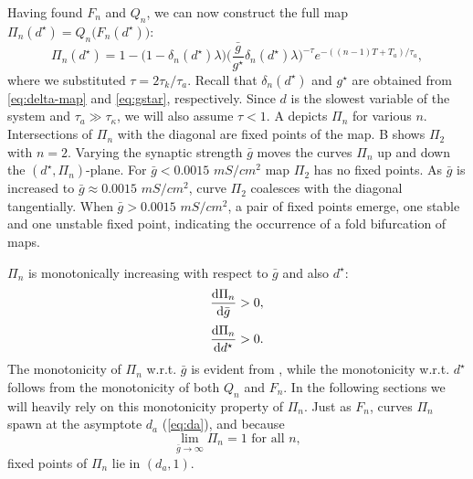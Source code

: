 Having found $F_n$ and $Q_n$, we can now construct the full map $\Pi_n(d^\star)=Q_n\big(F_n(d^\star)\big)$:
\begin{equation}
	\label{eq:Pn-map}
	\Pi_n(d^\star) = 1 - \Big(1 - \delta_n(d^\star) \lambda \Big)
	\Big(\frac{\bar g}{g^\star}\delta_n(d^\star) \lambda \Big)^{-\tau}
	e^{-((n-1)T + T_{a})/\tau_a},
\end{equation}
where we substituted $\tau = 2\tau_{k}/\tau_{a}$.
Recall that $\delta_{n}(d^{\star})$ and $g^{\star}$ are obtained from \cref{eq:delta-map} and \cref{eq:gstar}, respectively.
Since $d$ is the slowest variable of the system and $\tau_a \gg \tau_\kappa$, we will also assume $\tau<1$.
A depicts $\Pi_n$ for various $n$.
Intersections of $\Pi_{n}$ with the diagonal are fixed points of the map.
B shows $\Pi_{2}$ with $n=2$.
Varying the synaptic strength $\bar g$ moves the curves $\Pi_{n}$ up and down the $(d^{\star}, \Pi_{n})$-plane.
For $\bar g < 0.0015$ $\si{mS/cm^{2}}$ map $\Pi_{2}$ has no fixed points.
As $\bar g$ is increased to $\bar g \approx 0.0015$ $\si{mS/cm^{2}}$, curve $\Pi_{2}$ coalesces with the diagonal tangentially.
When $\bar g > 0.0015$ $\si{mS/cm^{2}}$, a pair of fixed points emerge, one stable and one unstable fixed point, indicating the occurrence of a fold bifurcation of maps.


$\Pi_n$ is monotonically increasing with respect to $\bar g$ and also $d^\star$:
\begin{align}
	\label{eq:non-degen1}
	\dv{\Pi_n}{\bar g}  & >0, \\[0.5ex]
	\label{eq:dPidd}
	\dv{\Pi_n}{d^\star} & >0.
\end{align}
\noindent
{}
The monotonicity of $\Pi_{n}$ w.r.t. $\bar g$ is evident from , while the monotonicity w.r.t. $d^{\star}$ follows from the monotonicity of both $Q_{n}$ and $F_{n}$.
In the following sections we will heavily rely on this monotonicity property of $\Pi_n$.
Just as $F_n$, curves $\Pi_n$ spawn at the asymptote $d_{a}$ (\cref{eq:da}), and because
\begin{equation}
	\lim_{\bar g \to \infty}\Pi_n = 1\text{ for all }n,
\end{equation}
fixed points of $\Pi_n$ lie in $(d_{a}, 1)$.

